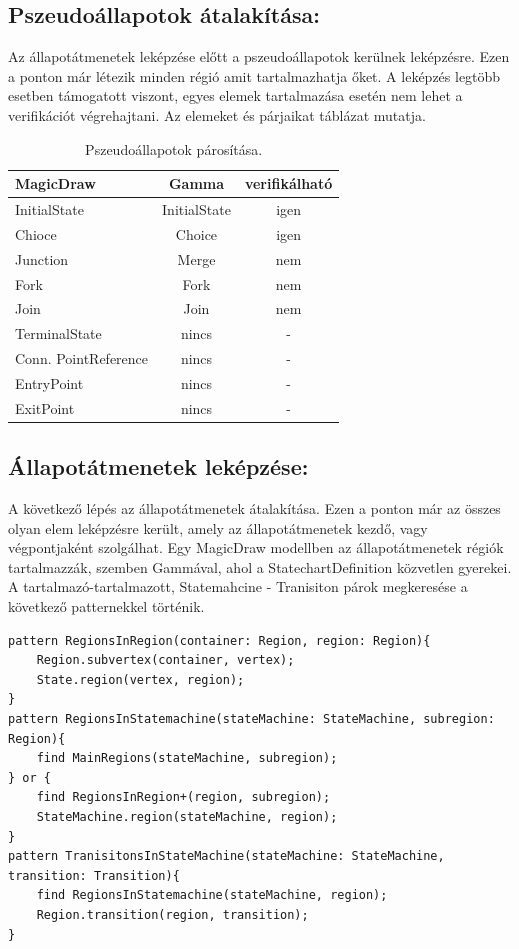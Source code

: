 \subsection{Pszeudoállapotok átalakítása:}
Az állapotátmenetek leképzése előtt a pszeudoállapotok kerülnek leképzésre. Ezen a ponton már létezik minden régió amit tartalmazhatja őket. A leképzés legtöbb esetben támogatott viszont, egyes elemek tartalmazása esetén nem lehet a verifikációt végrehajtani. Az elemeket és párjaikat  táblázat mutatja.

\begin{table}[!h]
	\footnotesize
	\centering
	\begin{tabular}{ l c c }
		MagicDraw & Gamma & verifikálható \\ \hline
		InitialState & InitialState & igen \\
		Chioce & Choice & igen \\
		Junction & Merge & nem \\
		Fork & Fork & nem \\
		Join & Join & nem \\
		TerminalState & nincs & - \\
		Conn. PointReference & nincs & - \\
		EntryPoint & nincs & - \\
		ExitPoint & nincs & -
		
	\end{tabular}
	\caption{Pszeudoállapotok párosítása.}
	\label{table:pseudo}
\end{table}

\subsection{Állapotátmenetek leképzése:} A következő lépés az állapotátmenetek átalakítása. Ezen a ponton már az összes olyan elem leképzésre került, amely az állapotátmenetek kezdő, vagy végpontjaként szolgálhat. Egy MagicDraw modellben az állapotátmenetek régiók tartalmazzák, szemben Gammával, ahol a StatechartDefinition közvetlen gyerekei. A tartalmazó-tartalmazott, Statemahcine - Tranisiton párok megkeresése a következő patternekkel történik.
\lstset{style=VQL}
\begin{lstlisting}
pattern RegionsInRegion(container: Region, region: Region){
	Region.subvertex(container, vertex);
	State.region(vertex, region);
}
pattern RegionsInStatemachine(stateMachine: StateMachine, subregion: Region){
	find MainRegions(stateMachine, subregion);
} or {
	find RegionsInRegion+(region, subregion);
	StateMachine.region(stateMachine, region);
}
pattern TranisitonsInStateMachine(stateMachine: StateMachine, transition: Transition){
	find RegionsInStatemachine(stateMachine, region);
	Region.transition(region, transition);
}
\end{lstlisting}

